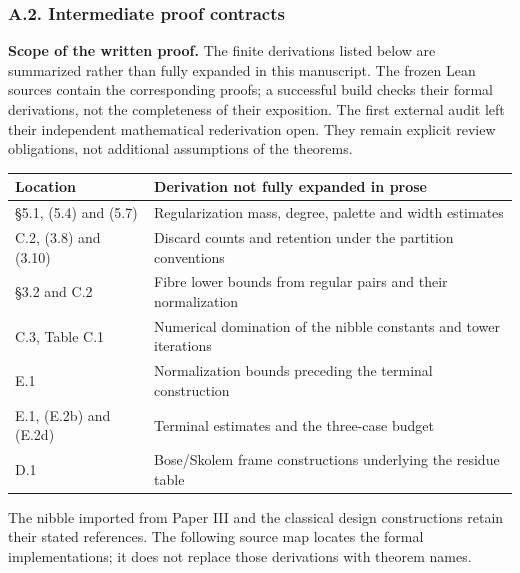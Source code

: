 \documentclass[english,11pt,a4paper]{article}
\newcounter{none}
\begin{document}
\subsubsection{A.2. Intermediate proof contracts}\label{a.2.-intermediate-proof-contracts}

\textbf{Scope of the written proof.} The finite derivations listed below are summarized rather than fully expanded in this manuscript. The frozen Lean sources contain the corresponding proofs; a successful build checks their formal derivations, not the completeness of their exposition. The first external audit left their independent mathematical rederivation open. They remain explicit review obligations, not additional assumptions of the theorems.


{\def\LTcaptype{none} %
\begin{longtable}[c]{@{}
  >{\raggedright\arraybackslash}p{}
  >{\raggedright\arraybackslash}p{}@{}}
\toprule\noalign{}
\begin{minipage}[b]{\linewidth}\raggedright
Location
\end{minipage} & \begin{minipage}[b]{\linewidth}\raggedright
Derivation not fully expanded in prose
\end{minipage} \\
\midrule\noalign{}
\endhead
\bottomrule\noalign{}
\endlastfoot
§5.1, (5.4) and (5.7) & Regularization mass, degree, palette and width estimates \\
C.2, (3.8) and (3.10) & Discard counts and retention under the partition conventions \\
§3.2 and C.2 & Fibre lower bounds from regular pairs and their normalization \\
C.3, Table C.1 & Numerical domination of the nibble constants and tower iterations \\
E.1 & Normalization bounds preceding the terminal construction \\
E.1, (E.2b) and (E.2d) & Terminal estimates and the three-case budget \\
D.1 & Bose/Skolem frame constructions underlying the residue table \\
\end{longtable}
}

The nibble imported from Paper III and the classical design constructions retain their stated references. The following source map locates the formal implementations; it does not replace those derivations with theorem names.
\end{document}
